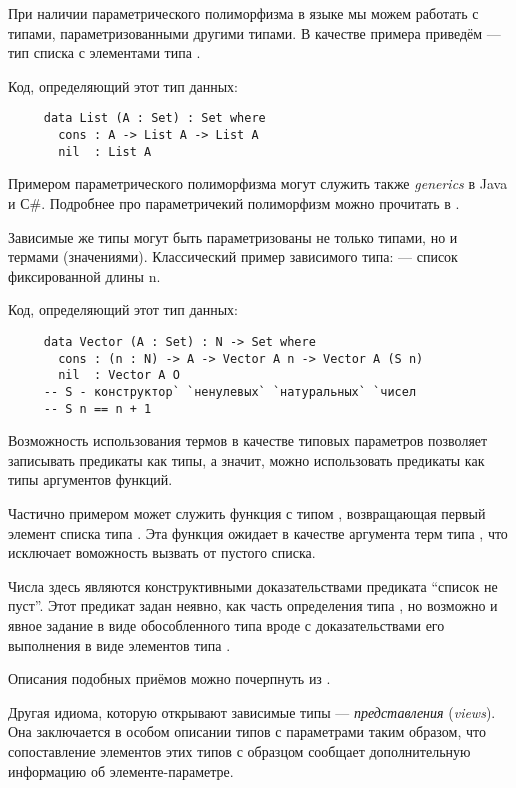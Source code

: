      При наличии параметрического полиморфизма в языке мы можем работать с типами, параметризованными другими типами. В качестве примера приведём \:--- тип списка с элементами типа .

     Код, определяющий этот тип данных:
     \begin{lstlisting}
     data List (A : Set) : Set where
       cons : A -> List A -> List A
       nil  : List A
     \end{lstlisting}

     Примером параметрического полиморфизма могут служить также \emph{generics} в Java и С\#. Подробнее про параметричекий полиморфизм можно прочитать в \cite{DBLP:journals/lisp/Strachey00}.

     Зависимые же типы могут быть параметризованы не только типами, но и термами (значениями). Классический пример зависимого типа: \:--- список фиксированной длины n.

     Код, определяющий этот тип данных:
     \begin{lstlisting}
     data Vector (A : Set) : N -> Set where
       cons : (n : N) -> A -> Vector A n -> Vector A (S n)
       nil  : Vector A O
     -- S - конструктор` `ненулевых` `натуральных` `чисел
     -- S n == n + 1
     \end{lstlisting}
     
     Возможность использования термов в качестве типовых параметров позволяет записывать предикаты как типы, а значит, можно использовать предикаты как типы аргументов функций.

     Частично примером может служить функция  с типом , возвращающая первый элемент списка типа . Эта функция ожидает в качестве аргумента терм типа , что исключает воможность вызвать  от пустого списка.

     Числа  здесь являются конструктивными доказательствами предиката ``список не пуст''. Этот предикат задан неявно, как часть определения типа , но возможно и явное задание в виде обособленного типа вроде  с доказательствами его выполнения в виде элементов типа .

     Описания подобных приёмов можно почерпнуть из \cite{DBLP:conf/tldi/Norell09}.

     Другая идиома, которую открывают зависимые типы --- \emph{представления} (\emph{views}). Она заключается в особом описании типов с параметрами таким образом, что сопоставление элементов этих типов с образцом сообщает дополнительную информацию об элементе-параметре.

